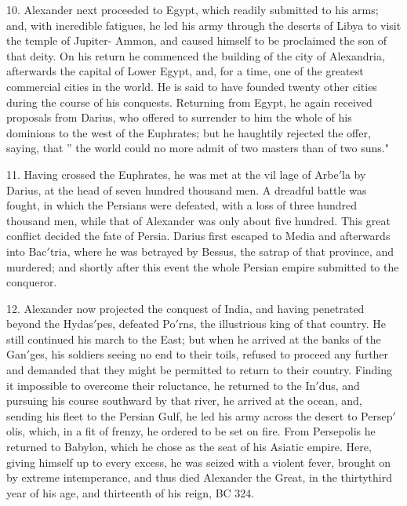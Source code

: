 \documentclass[openany,a4paper]{memoir}
\begin{document}
10. Alexander next proceeded to Egypt, which readily submitted to his arms; and, with incredible fatigues, he led his 
army through the deserts of Libya to visit the temple of 
Jupiter- Ammon, and caused himself to be proclaimed the son 
of that deity. On his return he commenced the building 
of the city of Alexandria, afterwards the capital of Lower 
Egypt, and, for a time, one of the greatest commercial cities 
in the world. He is said to have founded twenty other cities 
during the course of his conquests. Returning from Egypt, 
he again received proposals from Darius, who offered to surrender to him the whole of his dominions to the west of the 
Euphrates; but he haughtily rejected the offer, saying, that 
'' the world could no more admit of two masters than of two 
suns." 

11. Having crossed the Euphrates, he was met at the vil
lage of Arbe$'$la by Darius, at the head of seven hundred 
thousand men. A dreadful battle was fought, in which the 
Persians were defeated, with a loss of three hundred thousand 
men, while that of Alexander was only about five hundred. 
This great conflict decided the fate of Persia. Darius first 
escaped to Media and afterwards into Bac$'$tria, where he was 
betrayed by Bessus, the satrap of that province, and murdered; 
and shortly after this event the whole Persian empire submitted to the conqueror. 

12. Alexander now projected the conquest of India, and 
having penetrated beyond the Hydas$'$pes, defeated Po$'$rns, 
the illustrious king of that country. He still continued his 
march to the East; but when he arrived at the banks of the 
Gan$'$ges, his soldiers seeing no end to their toils, refused to 
proceed any further and demanded that they might be permitted to return to their country. Finding it impossible to 
overcome their reluctance, he returned to the In$'$dus, and 
pursuing his course southward by that river, he arrived at 
the ocean, and, sending his fleet to the Persian Gulf, he led 
his army across the desert to Persep$'$olis, which, in a fit of 
frenzy, he ordered to be set on fire. From Persepolis he returned to Babylon, which he chose as the seat of his Asiatic 
empire. Here, giving himself up to every excess, he was 
seized with a violent fever, brought on by extreme intemperance, and thus died Alexander the Great, in the thirtythird year of his age, and thirteenth of his reign, BC 324. 
\end{document}
